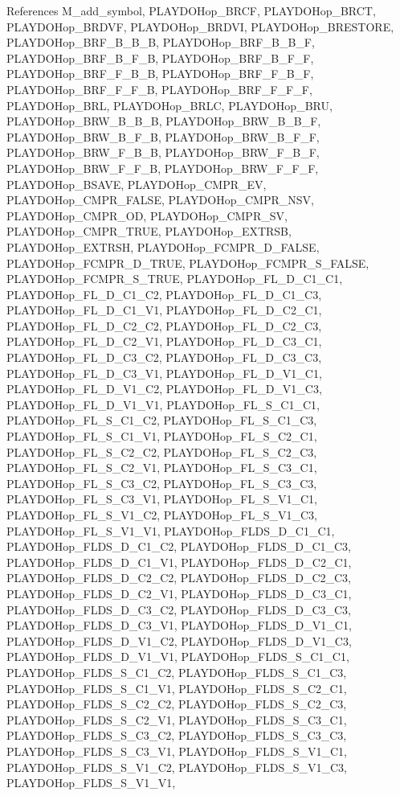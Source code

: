 References M\_\-add\_\-symbol, PLAYDOHop\_\-BRCF, PLAYDOHop\_\-BRCT, PLAYDOHop\_\-BRDVF, PLAYDOHop\_\-BRDVI, PLAYDOHop\_\-BRESTORE, PLAYDOHop\_\-BRF\_\-B\_\-B\_\-B, PLAYDOHop\_\-BRF\_\-B\_\-B\_\-F, PLAYDOHop\_\-BRF\_\-B\_\-F\_\-B, PLAYDOHop\_\-BRF\_\-B\_\-F\_\-F, PLAYDOHop\_\-BRF\_\-F\_\-B\_\-B, PLAYDOHop\_\-BRF\_\-F\_\-B\_\-F, PLAYDOHop\_\-BRF\_\-F\_\-F\_\-B, PLAYDOHop\_\-BRF\_\-F\_\-F\_\-F, PLAYDOHop\_\-BRL, PLAYDOHop\_\-BRLC, PLAYDOHop\_\-BRU, PLAYDOHop\_\-BRW\_\-B\_\-B\_\-B, PLAYDOHop\_\-BRW\_\-B\_\-B\_\-F, PLAYDOHop\_\-BRW\_\-B\_\-F\_\-B, PLAYDOHop\_\-BRW\_\-B\_\-F\_\-F, PLAYDOHop\_\-BRW\_\-F\_\-B\_\-B, PLAYDOHop\_\-BRW\_\-F\_\-B\_\-F, PLAYDOHop\_\-BRW\_\-F\_\-F\_\-B, PLAYDOHop\_\-BRW\_\-F\_\-F\_\-F, PLAYDOHop\_\-BSAVE, PLAYDOHop\_\-CMPR\_\-EV, PLAYDOHop\_\-CMPR\_\-FALSE, PLAYDOHop\_\-CMPR\_\-NSV, PLAYDOHop\_\-CMPR\_\-OD, PLAYDOHop\_\-CMPR\_\-SV, PLAYDOHop\_\-CMPR\_\-TRUE, PLAYDOHop\_\-EXTRSB, PLAYDOHop\_\-EXTRSH, PLAYDOHop\_\-FCMPR\_\-D\_\-FALSE, PLAYDOHop\_\-FCMPR\_\-D\_\-TRUE, PLAYDOHop\_\-FCMPR\_\-S\_\-FALSE, PLAYDOHop\_\-FCMPR\_\-S\_\-TRUE, PLAYDOHop\_\-FL\_\-D\_\-C1\_\-C1, PLAYDOHop\_\-FL\_\-D\_\-C1\_\-C2, PLAYDOHop\_\-FL\_\-D\_\-C1\_\-C3, PLAYDOHop\_\-FL\_\-D\_\-C1\_\-V1, PLAYDOHop\_\-FL\_\-D\_\-C2\_\-C1, PLAYDOHop\_\-FL\_\-D\_\-C2\_\-C2, PLAYDOHop\_\-FL\_\-D\_\-C2\_\-C3, PLAYDOHop\_\-FL\_\-D\_\-C2\_\-V1, PLAYDOHop\_\-FL\_\-D\_\-C3\_\-C1, PLAYDOHop\_\-FL\_\-D\_\-C3\_\-C2, PLAYDOHop\_\-FL\_\-D\_\-C3\_\-C3, PLAYDOHop\_\-FL\_\-D\_\-C3\_\-V1, PLAYDOHop\_\-FL\_\-D\_\-V1\_\-C1, PLAYDOHop\_\-FL\_\-D\_\-V1\_\-C2, PLAYDOHop\_\-FL\_\-D\_\-V1\_\-C3, PLAYDOHop\_\-FL\_\-D\_\-V1\_\-V1, PLAYDOHop\_\-FL\_\-S\_\-C1\_\-C1, PLAYDOHop\_\-FL\_\-S\_\-C1\_\-C2, PLAYDOHop\_\-FL\_\-S\_\-C1\_\-C3, PLAYDOHop\_\-FL\_\-S\_\-C1\_\-V1, PLAYDOHop\_\-FL\_\-S\_\-C2\_\-C1, PLAYDOHop\_\-FL\_\-S\_\-C2\_\-C2, PLAYDOHop\_\-FL\_\-S\_\-C2\_\-C3, PLAYDOHop\_\-FL\_\-S\_\-C2\_\-V1, PLAYDOHop\_\-FL\_\-S\_\-C3\_\-C1, PLAYDOHop\_\-FL\_\-S\_\-C3\_\-C2, PLAYDOHop\_\-FL\_\-S\_\-C3\_\-C3, PLAYDOHop\_\-FL\_\-S\_\-C3\_\-V1, PLAYDOHop\_\-FL\_\-S\_\-V1\_\-C1, PLAYDOHop\_\-FL\_\-S\_\-V1\_\-C2, PLAYDOHop\_\-FL\_\-S\_\-V1\_\-C3, PLAYDOHop\_\-FL\_\-S\_\-V1\_\-V1, PLAYDOHop\_\-FLDS\_\-D\_\-C1\_\-C1, PLAYDOHop\_\-FLDS\_\-D\_\-C1\_\-C2, PLAYDOHop\_\-FLDS\_\-D\_\-C1\_\-C3, PLAYDOHop\_\-FLDS\_\-D\_\-C1\_\-V1, PLAYDOHop\_\-FLDS\_\-D\_\-C2\_\-C1, PLAYDOHop\_\-FLDS\_\-D\_\-C2\_\-C2, PLAYDOHop\_\-FLDS\_\-D\_\-C2\_\-C3, PLAYDOHop\_\-FLDS\_\-D\_\-C2\_\-V1, PLAYDOHop\_\-FLDS\_\-D\_\-C3\_\-C1, PLAYDOHop\_\-FLDS\_\-D\_\-C3\_\-C2, PLAYDOHop\_\-FLDS\_\-D\_\-C3\_\-C3, PLAYDOHop\_\-FLDS\_\-D\_\-C3\_\-V1, PLAYDOHop\_\-FLDS\_\-D\_\-V1\_\-C1, PLAYDOHop\_\-FLDS\_\-D\_\-V1\_\-C2, PLAYDOHop\_\-FLDS\_\-D\_\-V1\_\-C3, PLAYDOHop\_\-FLDS\_\-D\_\-V1\_\-V1, PLAYDOHop\_\-FLDS\_\-S\_\-C1\_\-C1, PLAYDOHop\_\-FLDS\_\-S\_\-C1\_\-C2, PLAYDOHop\_\-FLDS\_\-S\_\-C1\_\-C3, PLAYDOHop\_\-FLDS\_\-S\_\-C1\_\-V1, PLAYDOHop\_\-FLDS\_\-S\_\-C2\_\-C1, PLAYDOHop\_\-FLDS\_\-S\_\-C2\_\-C2, PLAYDOHop\_\-FLDS\_\-S\_\-C2\_\-C3, PLAYDOHop\_\-FLDS\_\-S\_\-C2\_\-V1, PLAYDOHop\_\-FLDS\_\-S\_\-C3\_\-C1, PLAYDOHop\_\-FLDS\_\-S\_\-C3\_\-C2, PLAYDOHop\_\-FLDS\_\-S\_\-C3\_\-C3, PLAYDOHop\_\-FLDS\_\-S\_\-C3\_\-V1, PLAYDOHop\_\-FLDS\_\-S\_\-V1\_\-C1, PLAYDOHop\_\-FLDS\_\-S\_\-V1\_\-C2, PLAYDOHop\_\-FLDS\_\-S\_\-V1\_\-C3, PLAYDOHop\_\-FLDS\_\-S\_\-V1\_\-V1, 